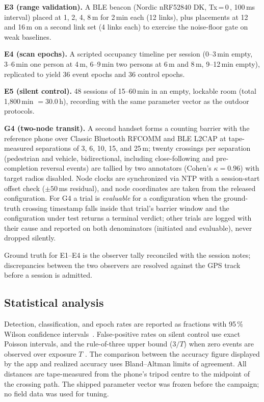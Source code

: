 \documentclass[journal,10pt]{IEEEtran}
\newcommand{\dBm}{\text{dBm}}
\begin{document}
\textbf{E3 (range validation).} A BLE beacon (Nordic nRF52840 DK,
Tx\,=\,0\,\dBm, 100\,ms interval) placed at 1, 2, 4, 8\,m for 2\,min each
(12 links), plus placements at 12 and 16\,m on a second link set (4 links
each) to exercise the noise-floor gate on weak baselines.

\textbf{E4 (scan epochs).} A scripted occupancy timeline per session
(0--3\,min empty, 3--6\,min one person at 4\,m, 6--9\,min two persons at 6\,m
and 8\,m, 9--12\,min empty), replicated to yield 36 event epochs and 36
control epochs.

\textbf{E5 (silent control).} 48 sessions of 15--60\,min in an empty,
lockable room (total 1{,}800\,min $=30.0$\,h), recording with the same
parameter vector as the outdoor protocols.

\textbf{G4 (two-node transit).} A second handset forms a counting barrier
with the reference phone over Classic Bluetooth RFCOMM and BLE L2CAP at
tape-measured separations of 3, 6, 10, 15, and 25\,m; twenty crossings per
separation (pedestrian and vehicle, bidirectional, including close-following
and pre-completion reversal events) are tallied by two annotators (Cohen's
$\kappa = 0.96$) with target radios disabled. Node clocks are synchronized
via NTP with a session-start offset check ($\pm50$\,ms residual), and node
coordinates are taken from the released configuration. For G4 a trial is
\emph{evaluable} for a configuration when the ground-truth crossing timestamp
falls inside that trial's barrier window and the configuration under test returns
a terminal verdict; other trials are logged with their cause and reported on both
denominators (initiated and evaluable), never dropped silently.

Ground truth for E1--E4 is the observer tally reconciled with the session
notes; discrepancies between the two observers are resolved against the GPS
track before a session is admitted.

\subsection{Statistical analysis}
Detection, classification, and epoch rates are reported as fractions with 95\,\%
Wilson confidence intervals~\cite{Brown2001Wilson}. False-positive rates on
silent control use exact Poisson intervals, and the rule-of-three upper
bound ($3/T$) when zero events are observed over exposure $T$
\cite{Hanley1983RuleOfThree}. The comparison between the accuracy figure
displayed by the app and realized accuracy uses Bland--Altman limits of
agreement. All distances are tape-measured from the phone's tripod centre to
the midpoint of the crossing path. The shipped parameter vector was frozen
before the campaign; no field data was used for tuning.
\end{document}
